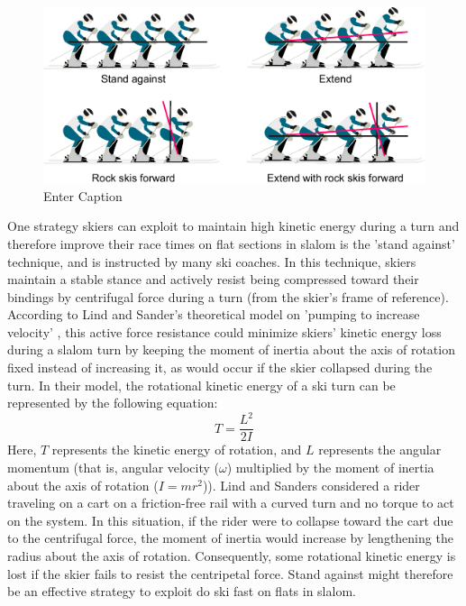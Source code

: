 
\begin{figure}
    \centering
    \includegraphics[width=1\linewidth]{figure/figure_introduction_strategies.pdf}
    \caption{Enter Caption}
    \label{fig: strategies}
\end{figure}





One strategy skiers can exploit to maintain high kinetic energy during a turn and therefore improve their race times on flat sections in slalom is the 'stand against' technique, and is instructed by many ski coaches. In this technique, skiers maintain a stable stance and actively resist being compressed toward their bindings by centrifugal force during a turn (from the skier's frame of reference). According to Lind and Sander's theoretical model on 'pumping to increase velocity' \cite{lind_physics_2013}, this active force resistance could minimize skiers' kinetic energy loss during a slalom turn by keeping the moment of inertia about the axis of rotation fixed instead of increasing it, as would occur if the skier collapsed during the turn. In their model, the rotational kinetic energy of a ski turn can be represented by the following equation: 
\[ T = \frac{L^2}{2I} \]
Here, $T$ represents the kinetic energy of rotation, and $L$ represents the angular momentum (that is, angular velocity ($\omega$) multiplied by the moment of inertia about the axis of rotation ($I = mr^2$)). Lind and Sanders considered a rider traveling on a cart on a friction-free rail with a curved turn and no torque to act on the system. In this situation, if the rider were to collapse toward the cart due to the centrifugal force, the moment of inertia would increase by lengthening the radius about the axis of rotation. Consequently, some rotational kinetic energy is lost if the skier fails to resist the centripetal force. Stand against might therefore be an effective strategy to exploit do ski fast on flats in slalom.  

